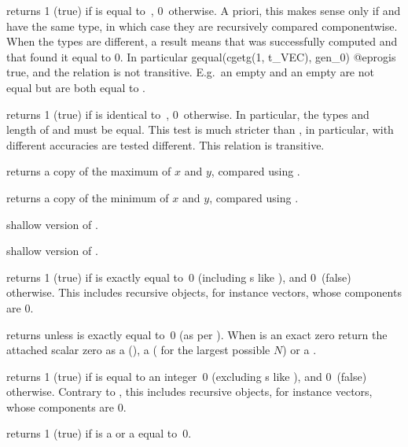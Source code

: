  returns 1 (true) if  is equal
to~, 0~otherwise. A priori, this makes sense only if  and
 have the same type, in which case they are recursively compared
componentwise. When the types are different, a  result
means that  was successfully computed and that
 found it equal to $0$. In particular
\bprog
  gequal(cgetg(1, t_VEC), gen_0)
@eprog\noindent is true, and the relation is not transitive. E.g.~an empty
 and an empty  are not equal but are both equal to
.

 returns 1 (true) if  is identical
to~, 0~otherwise. In particular, the types and length of  and
 must be equal. This test is much stricter than , in
particular,  with different accuracies are tested different. This
relation is transitive.

 returns a copy of the maximum of $x$ and $y$,
compared using .

 returns a copy of the minimum of $x$ and $y$,
compared using .

 shallow version of .

 shallow version of .


 returns 1 (true) if  is exactly equal
to~0 (including s like ), and 0~(false) otherwise.
This includes recursive objects, for instance vectors, whose components are $0$.

 returns  unless  is exactly
equal to~0 (as per ). When  is an exact zero
return the attached scalar zero as a  (),
a  ( for the largest possible $N$) or a
.

 returns 1 (true) if  is equal
to an integer~0 (excluding s like ), and 0~(false)
otherwise. Contrary to , this includes recursive objects, for
instance vectors, whose components are $0$.

 returns 1 (true) if  is a  or
a  equal to~0.

